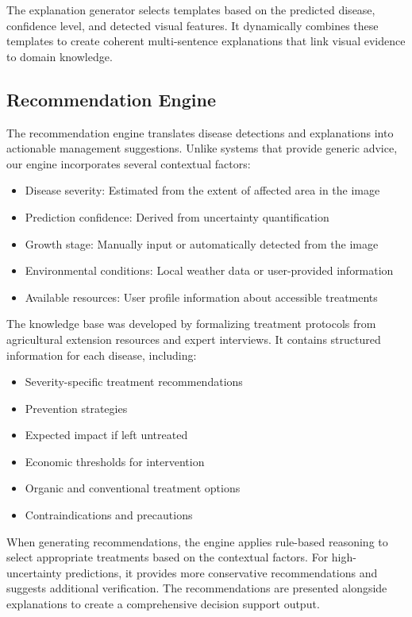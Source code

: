 The explanation generator selects templates based on the predicted disease, confidence level, and detected visual features. It dynamically combines these templates to create coherent multi-sentence explanations that link visual evidence to domain knowledge.

\subsection{Recommendation Engine}

The recommendation engine translates disease detections and explanations into actionable management suggestions. Unlike systems that provide generic advice, our engine incorporates several contextual factors:

\begin{itemize}
    \item Disease severity: Estimated from the extent of affected area in the image
    \item Prediction confidence: Derived from uncertainty quantification
    \item Growth stage: Manually input or automatically detected from the image
    \item Environmental conditions: Local weather data or user-provided information
    \item Available resources: User profile information about accessible treatments
\end{itemize}

The knowledge base was developed by formalizing treatment protocols from agricultural extension resources and expert interviews. It contains structured information for each disease, including:

\begin{itemize}
    \item Severity-specific treatment recommendations
    \item Prevention strategies
    \item Expected impact if left untreated
    \item Economic thresholds for intervention
    \item Organic and conventional treatment options
    \item Contraindications and precautions
\end{itemize}

When generating recommendations, the engine applies rule-based reasoning to select appropriate treatments based on the contextual factors. For high-uncertainty predictions, it provides more conservative recommendations and suggests additional verification. The recommendations are presented alongside explanations to create a comprehensive decision support output.


